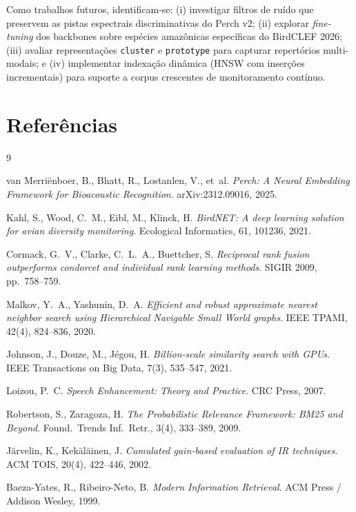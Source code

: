 \documentclass[12pt,a4paper]{article}
\begin{document}
Como trabalhos futuros, identificam-se: (i) investigar filtros de ruído que
preservem as pistas espectrais discriminativas do Perch v2; (ii) explorar
\emph{fine-tuning} dos backbones sobre espécies amazônicas específicas do
BirdCLEF 2026; (iii) avaliar representações \texttt{cluster} e \texttt{prototype}
para capturar repertórios multi-modais; e (iv) implementar indexação dinâmica
(HNSW com inserções incrementais) para suporte a corpus crescentes de monitoramento
contínuo.

\section*{Referências}

\begingroup
\renewcommand{\section}[2]{}
\begin{thebibliography}{9}

  van Merriënboer, B., Bhatt, R., Lostanlen, V., et~al.
  \textit{Perch: A Neural Embedding Framework for Bioacoustic Recognition}.
  arXiv:2312.09016, 2025.

  Kahl, S., Wood, C.~M., Eibl, M., Klinck, H.
  \textit{BirdNET: A deep learning solution for avian diversity monitoring}.
  Ecological Informatics, 61, 101236, 2021.

  Cormack, G.~V., Clarke, C.~L.~A., Buettcher, S.
  \textit{Reciprocal rank fusion outperforms condorcet and individual rank learning methods}.
  SIGIR 2009, pp.\ 758--759.

  Malkov, Y.~A., Yashunin, D.~A.
  \textit{Efficient and robust approximate nearest neighbor search using Hierarchical Navigable Small World graphs}.
  IEEE TPAMI, 42(4), 824--836, 2020.

  Johnson, J., Douze, M., Jégou, H.
  \textit{Billion-scale similarity search with GPUs}.
  IEEE Transactions on Big Data, 7(3), 535--547, 2021.

  Loizou, P.~C.
  \textit{Speech Enhancement: Theory and Practice}.
  CRC Press, 2007.

  Robertson, S., Zaragoza, H.
  \textit{The Probabilistic Relevance Framework: BM25 and Beyond}.
  Found.\ Trends Inf.\ Retr., 3(4), 333--389, 2009.

  Järvelin, K., Kekäläinen, J.
  \textit{Cumulated gain-based evaluation of IR techniques}.
  ACM TOIS, 20(4), 422--446, 2002.

  Baeza-Yates, R., Ribeiro-Neto, B.
  \textit{Modern Information Retrieval}.
  ACM Press / Addison Wesley, 1999.

\end{thebibliography}
\endgroup
\end{document}
